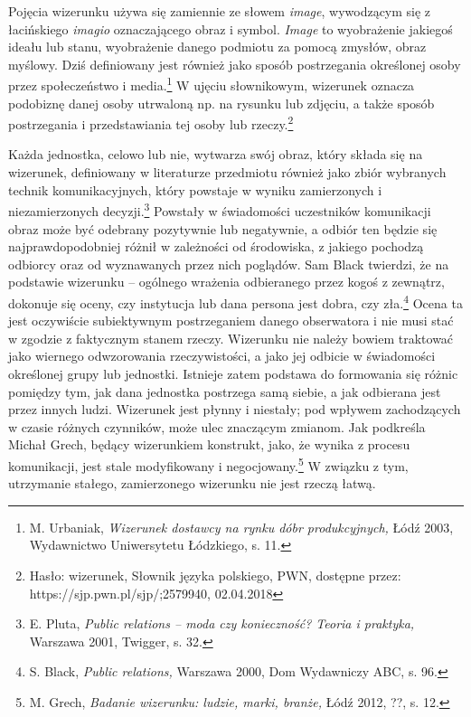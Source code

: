 \documentclass[12pt, a4paper, titlepage]{report}
\begin{document}
Pojęcia wizerunku używa się zamiennie ze słowem \textit{image}, wywodzącym się z łacińskiego \textit{imagio} oznaczającego obraz i symbol. \textit{Image} to wyobrażenie jakiegoś ideału lub stanu, wyobrażenie danego podmiotu za pomocą zmysłów, obraz myślowy. Dziś definiowany jest również jako sposób postrzegania określonej osoby przez społeczeństwo i media.\footnote{M. Urbaniak, \textit{Wizerunek dostawcy na rynku dóbr produkcyjnych,} Łódź 2003, Wydawnictwo Uniwersytetu Łódzkiego, s. 11.} W ujęciu słownikowym, wizerunek oznacza podobiznę danej osoby utrwaloną np. na rysunku lub zdjęciu, a także sposób postrzegania i przedstawiania tej osoby lub rzeczy.\footnote{Hasło: wizerunek, Słownik języka polskiego, PWN, dostępne przez: https://sjp.pwn.pl/sjp/;2579940, 02.04.2018}

Każda jednostka, celowo lub nie, wytwarza swój obraz, który składa się na wizerunek, definiowany w literaturze przedmiotu również jako zbiór wybranych technik komunikacyjnych, który powstaje w wyniku zamierzonych i niezamierzonych decyzji.\footnote{E. Pluta, \textit{Public relations -- moda czy konieczność? Teoria i praktyka,} Warszawa 2001, Twigger, s. 32.} Powstały w świadomości uczestników komunikacji obraz może być odebrany pozytywnie lub negatywnie, a odbiór ten będzie się najprawdopodobniej różnił w zależności od środowiska, z jakiego pochodzą odbiorcy oraz od wyznawanych przez nich poglądów. Sam Black twierdzi, że na podstawie wizerunku -- ogólnego wrażenia odbieranego przez kogoś z zewnątrz, dokonuje się oceny, czy instytucja lub dana persona jest dobra, czy zła.\footnote{S. Black, \textit{Public relations,} Warszawa 2000, Dom Wydawniczy ABC, s. 96.} Ocena ta jest oczywiście subiektywnym postrzeganiem danego obserwatora i nie musi stać w zgodzie z faktycznym stanem rzeczy. Wizerunku nie należy bowiem traktować jako wiernego odwzorowania rzeczywistości, a jako jej odbicie w świadomości określonej grupy lub jednostki. Istnieje zatem podstawa do formowania się różnic pomiędzy tym, jak dana jednostka postrzega samą siebie, a jak odbierana jest przez innych ludzi. Wizerunek jest płynny i niestały; pod wpływem zachodzących w czasie różnych czynników, może ulec znaczącym zmianom. Jak podkreśla Michał Grech, będący wizerunkiem konstrukt, jako, że wynika z procesu komunikacji, jest stale modyfikowany i negocjowany.\footnote{M. Grech, \textit{Badanie wizerunku: ludzie, marki, branże,} Łódź 2012, ??, s. 12.} W związku z tym, utrzymanie stałego, zamierzonego wizerunku nie jest rzeczą łatwą. 
\end{document}
